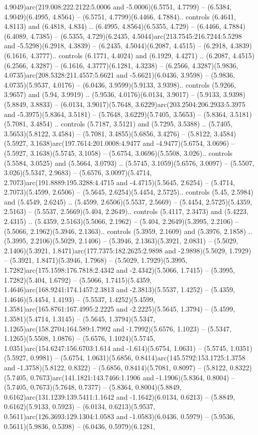 4.9049)arc(219.008:222.2122:5.0006 and -5.0006)(6.5751, 4.7799) -- (6.5384, 4.9049)(6.4995, 4.8564) -- (6.5751, 4.7799)(6.4466, 4.7884).. controls (6.4641, 4.8113) and (6.4818, 4.834) .. (6.4995, 4.8564)(6.5355, 4.729) -- (6.4466, 4.7884)(6.4089, 4.7385) -- (6.5355, 4.729)(6.2435, 4.5044)arc(213.7545:216.7244:5.5298 and -5.5298)(6.2918, 4.3839) -- (6.2435, 4.5044)(6.2087, 4.4515) -- (6.2918, 4.3839)(6.1616, 4.3777).. controls (6.1771, 4.4024) and (6.1929, 4.4271) .. (6.2087, 4.4515)(6.2566, 4.3287) -- (6.1616, 4.3777)(6.1281, 4.3238) -- (6.2566, 4.3287)(5.9836, 4.0735)arc(208.5328:211.4557:5.6621 and -5.6621)(6.0436, 3.9598) -- (5.9836, 4.0735)(5.9537, 4.0176) -- (6.0436, 3.9599)(5.9133, 3.9398).. controls (5.9266, 3.9657) and (5.94, 3.9919) .. (5.9536, 4.0176)(6.0134, 3.9017) -- (5.9133, 3.9398)(5.8849, 3.8833) -- (6.0134, 3.9017)(5.7648, 3.6229)arc(203.2504:206.2933:5.3975 and -5.3975)(5.8364, 3.5181) -- (5.7648, 3.6229)(5.7405, 3.5653) -- (5.8364, 3.5181)(5.7081, 3.4854) .. controls (5.7187, 3.5121) and (5.7295, 3.5388) .. (5.7405, 3.5653)(5.8122, 3.4584) -- (5.7081, 3.4855)(5.6856, 3.4276) -- (5.8122, 3.4584)(5.5927, 3.1638)arc(197.7614:201.0008:4.9477 and -4.9477)(5.6754, 3.0696) -- (5.5927, 3.1638)(5.5745, 3.1058) -- (5.6754, 3.0696)(5.5508, 3.026).. controls (5.5584, 3.0525) and (5.5664, 3.0793) .. (5.5745, 3.1059)(5.6576, 3.0097) -- (5.5507, 3.026)(5.5347, 2.9683) -- (5.6576, 3.0097)(5.4714, 2.7073)arc(191.8889:195.3288:4.4715 and -4.4715)(5.5645, 2.6254) -- (5.4714, 2.7073)(5.4599, 2.6506) -- (5.5645, 2.6254)(5.4454, 2.5725).. controls (5.45, 2.5984) and (5.4549, 2.6245) .. (5.4599, 2.6506)(5.5537, 2.5669) -- (5.4454, 2.5725)(5.4359, 2.5163) -- (5.5537, 2.5669)(5.404, 2.2649).. controls (5.4117, 2.3473) and (5.4223, 2.4315) .. (5.4359, 2.5163)(5.5066, 2.1962) -- (5.404, 2.2649)(5.3995, 2.2106) -- (5.5066, 2.1962)(5.3946, 2.1363).. controls (5.3959, 2.1609) and (5.3976, 2.1858) .. (5.3995, 2.2106)(5.5029, 2.1406) -- (5.3946, 2.1363)(5.3921, 2.0831) -- (5.5029, 2.1406)(5.3921, 1.8471)arc(177.7375:182.2625:2.9898 and -2.9898)(5.5029, 1.7929) -- (5.3921, 1.8471)(5.3946, 1.7968) -- (5.5029, 1.7929)(5.3995, 1.7282)arc(175.1598:176.7818:2.4342 and -2.4342)(5.5066, 1.7415) -- (5.3995, 1.7282)(5.404, 1.6792) -- (5.5066, 1.7415)(5.4359, 1.4646)arc(168.9241:174.1457:2.3813 and -2.3813)(5.5537, 1.4252) -- (5.4359, 1.4646)(5.4454, 1.4193) -- (5.5537, 1.4252)(5.4599, 1.3581)arc(165.8761:167.4995:2.2225 and -2.2225)(5.5645, 1.3794) -- (5.4599, 1.3581)(5.4714, 1.3145) -- (5.5645, 1.3794)(5.5347, 1.1265)arc(158.2704:164.589:1.7992 and -1.7992)(5.6576, 1.1023) -- (5.5347, 1.1265)(5.5508, 1.0876) -- (5.6576, 1.1024)(5.5745, 1.0351)arc(154.6247:156.6703:1.614 and -1.614)(5.6754, 1.0631) -- (5.5745, 1.0351)(5.5927, 0.9981) -- (5.6754, 1.0631)(5.6856, 0.8414)arc(145.5792:153.1725:1.3758 and -1.3758)(5.8122, 0.8322) -- (5.6856, 0.8414)(5.7081, 0.8097) -- (5.8122, 0.8322)(5.7405, 0.7673)arc(141.1821:143.7466:1.1906 and -1.1906)(5.8364, 0.8004) -- (5.7405, 0.7673)(5.7648, 0.7377) -- (5.8364, 0.8004)(5.8849, 0.6162)arc(131.1239:139.5411:1.1642 and -1.1642)(6.0134, 0.6213) -- (5.8849, 0.6162)(5.9133, 0.5923) -- (6.0134, 0.6213)(5.9537, 0.5611)arc(126.3693:129.1304:1.0583 and -1.0583)(6.0436, 0.5979) -- (5.9536, 0.5611)(5.9836, 0.5398) -- (6.0436, 0.5979)(6.1281, 